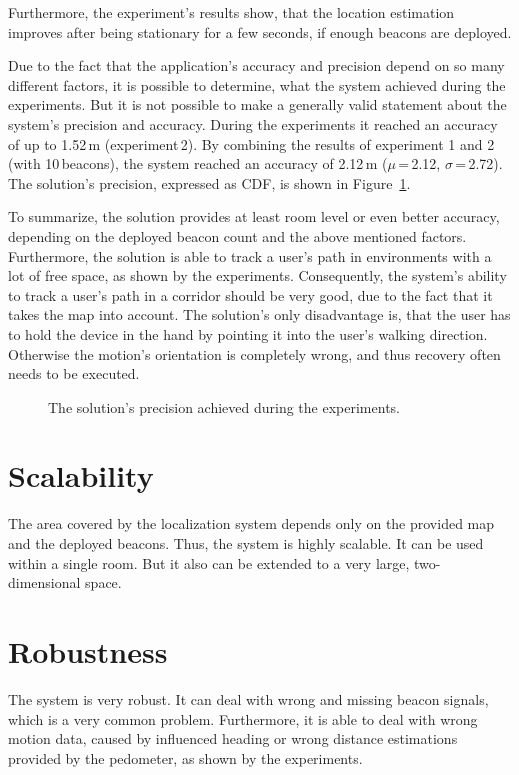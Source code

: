 Furthermore, the experiment's results show, that the location estimation improves after being stationary for a few seconds, if enough beacons are deployed.

Due to the fact that the application's accuracy and precision depend on so many different factors, it is possible to determine, what the system achieved during the experiments. But it is not possible to make a generally valid statement about the system's precision and accuracy. During the experiments it reached an accuracy of up to 1.52\,m (experiment\,2). By combining the results of experiment 1 and 2 (with 10\,beacons), the system reached an accuracy of 2.12\,m ($\mu$\,=\,2.12, $\sigma$\,=\,2.72). The solution's precision, expressed as \ac{CDF}, is shown in Figure~\ref{fig:eval:precision}.

To summarize, the solution provides at least room level or even better accuracy, depending on the deployed beacon count and the above mentioned factors. Furthermore, the solution is able to track a user's path in environments with a lot of free space, as shown by the experiments. Consequently, the system's ability to track a user's path in a corridor should be very good, due to the fact that it takes  the map into account. The solution's only disadvantage is, that the user has to hold the device in the hand by pointing it into the user's walking direction. Otherwise the motion's orientation is completely wrong, and thus recovery often needs to be executed.


\begin{figure}
	
	\caption{The solution's precision achieved during the experiments.}
	\label{fig:eval:precision}
\end{figure}


\section{Scalability}
The area covered by the localization system depends only on the provided map and the deployed beacons. Thus, the system is highly scalable. It can be used within a single room. But it also can be extended to a very large, two-dimensional space.

\section{Robustness}
The system is very robust. It can deal with wrong and missing beacon signals, which is a very common problem. Furthermore, it is able to deal with wrong motion data, caused by influenced heading or wrong distance estimations provided by the pedometer, as shown by the experiments.

